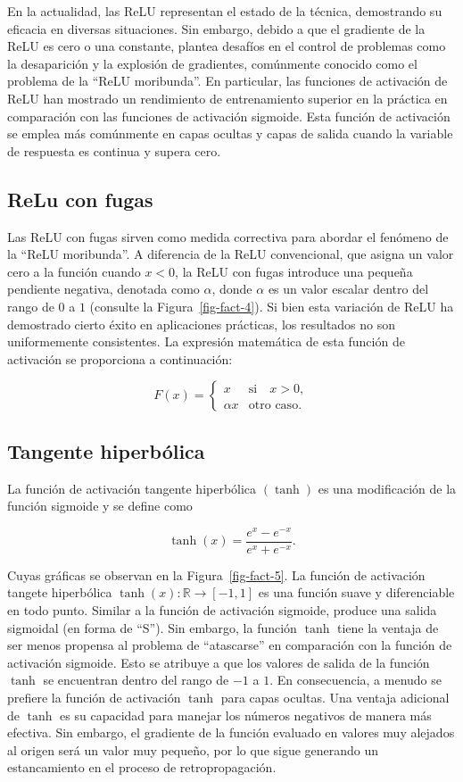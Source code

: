 \documentclass[
  us-letterpaper,
]{scrreprt}
\theoremstyle{plain}
\theoremstyle{definition}
\theoremstyle{definition}
\theoremstyle{plain}
\theoremstyle{remark}
\begin{document}
En la actualidad, las ReLU representan el estado de la técnica,
demostrando su eficacia en diversas situaciones. Sin embargo, debido a
que el gradiente de la ReLU es cero o una constante, plantea desafíos en
el control de problemas como la desaparición y la explosión de
gradientes, comúnmente conocido como el problema de la ``ReLU
moribunda''. En particular, las funciones de activación de ReLU han
mostrado un rendimiento de entrenamiento superior en la práctica en
comparación con las funciones de activación sigmoide. Esta función de
activación se emplea más comúnmente en capas ocultas y capas de salida
cuando la variable de respuesta es continua y supera cero.

\subsection{ReLu con fugas}\label{relu-con-fugas}

Las ReLU con fugas sirven como medida correctiva para abordar el
fenómeno de la ``ReLU moribunda''. A diferencia de la ReLU convencional,
que asigna un valor cero a la función cuando \(x < 0\), la ReLU con
fugas introduce una pequeña pendiente negativa, denotada como
\(\alpha\), donde \(\alpha\) es un valor escalar dentro del rango de
\(0\) a \(1\) (consulte la Figura~\ref{fig-fact-4}). Si bien esta
variación de ReLU ha demostrado cierto éxito en aplicaciones prácticas,
los resultados no son uniformemente consistentes. La expresión
matemática de esta función de activación se proporciona a continuación:

\[
F(x)=\begin{cases}x & \text{si}\quad x>0,\\ \alpha x& \text{otro caso.}\end{cases}
\]

\subsection{Tangente hiperbólica}\label{tangente-hiperbuxf3lica}

La función de activación tangente hiperbólica \((\tanh)\) es una
modificación de la función sigmoide y se define como

\[
\tanh(x)=\frac{e^x-e^{-x}}{e^{x}+e^{-x}}.
\]

Cuyas gráficas se observan en la Figura~\ref{fig-fact-5}. La función de
activación tangete hiperbólica \(\tanh(x):\mathbb R\to [-1,1]\) es una
función suave y diferenciable en todo punto. Similar a la función de
activación sigmoide, produce una salida sigmoidal (en forma de ``S'').
Sin embargo, la función \(\tanh\) tiene la ventaja de ser menos propensa
al problema de ``atascarse'' en comparación con la función de activación
sigmoide. Esto se atribuye a que los valores de salida de la función
\(\tanh\) se encuentran dentro del rango de \(-1\) a \(1\). En
consecuencia, a menudo se prefiere la función de activación \(\tanh\)
para capas ocultas. Una ventaja adicional de \(\tanh\) es su capacidad
para manejar los números negativos de manera más efectiva. Sin embargo,
el gradiente de la función evaluado en valores muy alejados al origen
será un valor muy pequeño, por lo que sigue generando un estancamiento
en el proceso de retropropagación.
\end{document}

